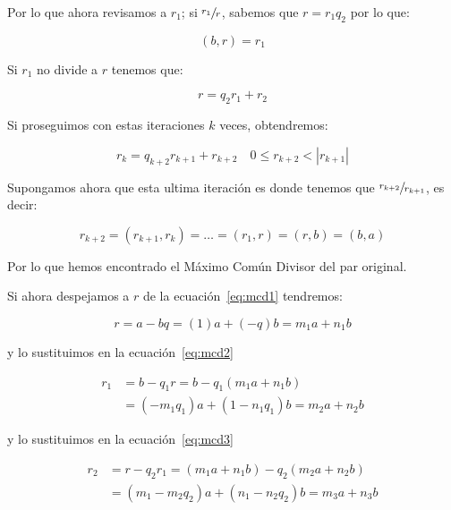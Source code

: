         Por lo que ahora revisamos a $r_1$; si $\sfrac{r_1}{r}$, sabemos que $r = r_1 q_2$ por lo que:

        \begin{equation*}
            (b, r) = r_1
        \end{equation*}

        Si $r_1$ no divide a $r$ tenemos que:

        \begin{equation} \label{eq:mcd3}
            r = q_2 r_1 + r_2
        \end{equation}

        Si proseguimos con estas iteraciones $k$ veces, obtendremos:

        \begin{equation*}
            r_k = q_{k+2} r_{k+1} + r_{k+2} \quad 0 \leq r_{k+2} < |r_{k+1}|
        \end{equation*}

        Supongamos ahora que esta ultima iteración es donde tenemos que $\sfrac{r_{k+2}}{r_{k+1}}$, es decir:

        \begin{equation*}
            r_{k+2} = (r_{k+1}, r_k) = \dots = (r_1, r) = (r, b) = (b, a)
        \end{equation*}

        Por lo que hemos encontrado el Máximo Común Divisor del par original.

        Si ahora despejamos a $r$ de la ecuación~\ref{eq:mcd1} tendremos:

        \begin{equation*}
            r = a - bq = (1)a + (-q)b = m_1 a + n_1 b
        \end{equation*}

        y lo sustituimos en la ecuación~\ref{eq:mcd2}

        \begin{align*}
            r_1 &= b - q_1 r = b - q_1 (m_1 a + n_1 b) \\
            &= (-m_1 q_1) a + (1 - n_1 q_1) b = m_2 a + n_2 b
        \end{align*}

        y lo sustituimos en la ecuación~\ref{eq:mcd3}

        \begin{align*}
            r_2 &= r - q_2 r_1 = (m_1 a + n_1 b) - q_2 (m_2 a + n_2 b) \\
            &= (m_1 - m_2 q_2) a + (n_1 - n_2 q_2) b = m_3 a + n_3 b
        \end{align*}

